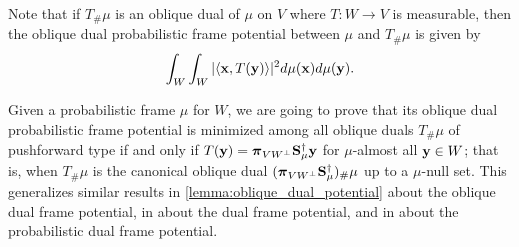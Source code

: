 \documentclass{amsart}
\numberwithin{equation}{section}
\newcommand{\bpi}{{\boldsymbol{\pi}}}
\theoremstyle{plain}
\theoremstyle{remark}
\theoremstyle{definition}
\begin{document}
Note that if $T_\# \mu$ is an oblique dual of $\mu$ on $V$ where $T: W \rightarrow V$ is measurable, then the oblique dual probabilistic frame potential between $\mu$ and $T_\# \mu$ is given by
 \begin{equation*}
        \int_{W}  \int_{W}  |\langle {\bf x}, T({\bf y}) \rangle|^{2} d\mu({\bf x}) d\mu({\bf y}).
    \end{equation*}
    
Given a probabilistic frame $\mu$ for $W$, we are going to prove that its oblique dual probabilistic frame potential is minimized among all oblique duals $T_\# \mu$ of pushforward type if and only if $T({\bf y}) =  \bpi_{VW^\perp}{\bf S}_\mu^{\dagger}{\bf y}$ for $\mu$-almost all ${\bf y} \in W$; that is, when $T_\# \mu$ is the canonical oblique dual $(\bpi_{VW^\perp}{\bf S}_\mu^{\dagger})_\#\mu$ up to a $\mu$-null set. This generalizes similar results in \cref{lemma:oblique_dual_potential} about the oblique dual frame potential, in \cite[Theorem~2.2]{christensen2020equiangular} about the dual frame potential, and in \cite[Theorem~3.5]{chen2025probabilistic} about the probabilistic dual frame potential.
\end{document}
